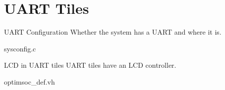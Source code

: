 \section{UART Tiles}

\begin{sysconfigbox}{UART Configuration}
Whether the system has a UART and where it is.
\begin{sysconfigboxref}{sysconfig.c}
\end{sysconfigboxref}
\end{sysconfigbox}

\begin{sysconfigbox}{LCD in UART tiles}
UART tiles have an LCD controller.
\begin{sysconfigboxref}{optimsoc\_def.vh}
\end{sysconfigboxref}
\end{sysconfigbox}

